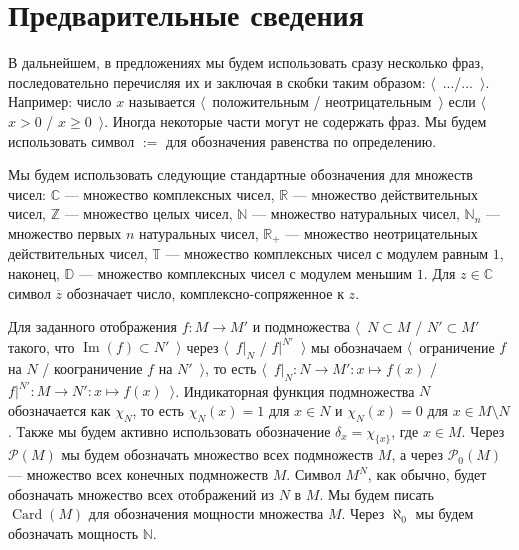 
\chapter{Предварительные сведения} %

\label{ChapterPreliminaries} %

В дальнейшем, в предложениях мы будем использовать сразу несколько фраз, последовательно перечисляя их и заключая в скобки таким образом: $\langle$~.../...~$\rangle$. Например: число $x$ называется $\langle$~положительным / неотрицательным~$\rangle$ если $\langle$~$x>0$ / $x\geq 0$~$\rangle$. Иногда некоторые части могут не  содержать фраз. Мы будем использовать символ $:=$ для обозначения равенства по определению.

Мы будем использовать следующие стандартные обозначения для множеств чисел: $\mathbb{C}$ --- множество комплексных чисел, $\mathbb{R}$ --- множество действительных чисел, $\mathbb{Z}$ --- множество целых чисел, $\mathbb{N}$ --- множество натуральных чисел, $\mathbb{N}_n$ --- множество первых $n$ натуральных чисел, $\mathbb{R}_+$ --- множество неотрицательных действительных чисел, $\mathbb{T}$ --- множество комплексных чисел с модулем равным $1$, наконец, $\mathbb{D}$ --- множество комплексных чисел с модулем меньшим $1$. Для $z\in\mathbb{C}$ символ $\overline{z}$ обозначает число, комплексно-сопряженное к $z$.

Для заданного отображения $f:M\to M'$ и подмножества $\langle$~$N\subset M$ / $N'\subset M'$ такого, что $\operatorname{Im}(f)\subset N'$~$\rangle$ через $\langle$~$f|_N$ / $f|^{N'}$~$\rangle$ мы обозначаем $\langle$~ограничение $f$ на $N$ / коограничение $f$ на $N'$~$\rangle$, то есть $\langle$~$f|_N:N\to M':x\mapsto f(x)$ / $f|^{N'}:M\to N':x\mapsto f(x)$~$\rangle$. Индикаторная функция подмножества $N$ обозначается как $\chi_{N}$, то есть $\chi_N(x)=1$ для $x\in N$ и $\chi_N(x)=0$ для $x\in M\setminus N$. Также мы будем активно использовать обозначение $\delta_x=\chi_{\{x\}}$, где $x\in M$. Через $\mathcal{P}(M)$ мы будем обозначать множество всех подмножеств $M$, а через $\mathcal{P}_0(M)$ --- множество всех конечных подмножеств $M$. Символ $M^N$, как обычно, будет обозначать множество всех отображений из $N$ в $M$. Мы будем писать $\operatorname{Card}(M)$ для обозначения мощности множества $M$. Через $\aleph_0$ мы будем обозначать мощность $\mathbb{N}$.


